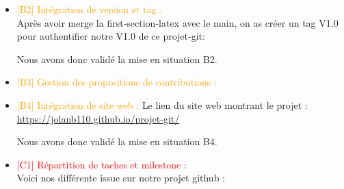 \begin{itemize}
    \item \textcolor{orange}{[B2] Intégration de version et tag : }
    \\Après avoir merge la first-section-latex avec le main, on as créer un tag V1.0 pour authentifier notre V1.0 de ce projet-git:

    
    

    Nous avons donc validé la mise en situation B2.
    
    \item \textcolor{orange}{[B3] Gestion des propositions de contributions : }
    \item \textcolor{orange}{[B4] Intégration de site web : }
    Le lien du site web montrant le projet : \url{https://jolanb110.github.io/projet-git/}

    Nous avons donc validé la mise en situation B4.
    \item \textcolor{red}{[C1] Répartition de taches et milestone : }
    \\Voici nos différente issue sur notre projet github :


\end{itemize}
